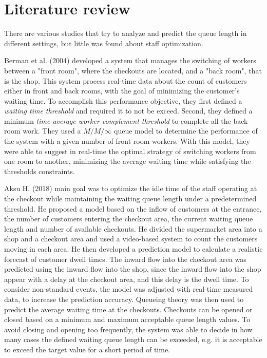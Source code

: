 \section{Literature review}
\label{sec:literature_review}

There are various studies that try to analyze and predict the queue length in different settings, but little was found about staff optimization.

Berman et al. (2004) \cite{berman} developed a system that manages the switching of workers between a "front room", where the checkouts are located, and a "back room", that is the shop. This system process real-time data about the count of customers either in front and back rooms, with the goal of minimizing the customer's waiting time. To accomplish this performance objective, they first defined a \emph{waiting time threshold} and required it to not be exceed. Second, they defined a minimum \emph{time-average worker complement threshold} to complete all the back room work. They used a \( M/M/\infty \) queue model to determine the performance of the system with a given number of front room workers. With this model, they were able to suggest in real-time the optimal strategy of switching workers from one room to another, minimizing the average waiting time while satisfying the thresholds constraints.

Aksu H. (2018) \cite{aksu} main goal was to optimize the idle time of the staff operating at the checkout while maintaining the waiting queue length under a predetermined threshold. He proposed a model based on the inflow of customers at the entrance, the number of customers entering the checkout area, the current waiting queue length and number of available checkouts. He divided the supermarket area into a shop and a checkout area and used a video-based system to count the customers moving in each area. He then developed a prediction model to calculate a realistic forecast of customer dwell times. The inward flow into the checkout area was predicted using the inward flow into the shop, since the inward flow into the shop appear with a delay at the checkout area, and this delay is the dwell time. To consider non-standard events, the model was adjusted with real-time measured data, to increase the prediction accuracy. Queueing theory was then used to predict the average waiting time at the checkouts. Checkouts can be opened or closed based on a minimum and maximum acceptable queue length values. To avoid closing and opening too frequently, the system was able to decide in how many cases the defined waiting queue length can be exceeded, e.g. it is acceptable to exceed the target value for a short period of time.

